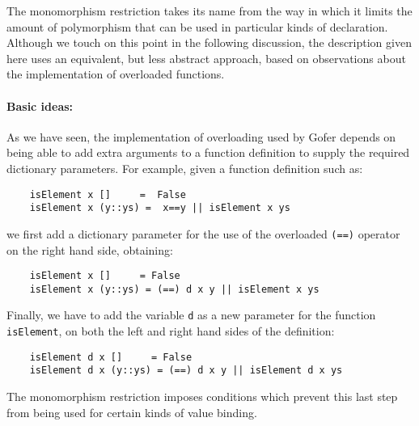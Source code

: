 The monomorphism restriction takes its name from the way  in  which  it
limits the amount of polymorphism that can be used in particular  kinds
of declaration.  Although we touch  on  this  point  in  the  following
discussion, the description given here uses  an  equivalent,  but  less
abstract approach, based on observations about  the  implementation  of
overloaded functions.

\paragraph{Basic ideas:}
As we have seen,  the  implementation  of  overloading  used  by  Gofer
depends on being able to add extra arguments to a  function  definition
to supply the required dictionary parameters.   For  example,  given  a
function definition such as:
\begin{verbatim}
    isElement x []     =  False
    isElement x (y::ys) =  x==y || isElement x ys
\end{verbatim}
we first add a dictionary parameter for the use of the overloaded  \verb"(==)"
operator on the right hand side, obtaining:
\begin{verbatim}
    isElement x []     = False
    isElement x (y::ys) = (==) d x y || isElement x ys
\end{verbatim}
Finally, we have to add the variable \verb"d"  as  a  new  parameter  for  the
function \verb"isElement", on both the  left  and  right  hand  sides  of  the
definition:
\begin{verbatim}
    isElement d x []     = False
    isElement d x (y::ys) = (==) d x y || isElement d x ys
\end{verbatim}
The monomorphism restriction imposes conditions which prevent this last
step from being used for certain kinds  of  value  binding.

